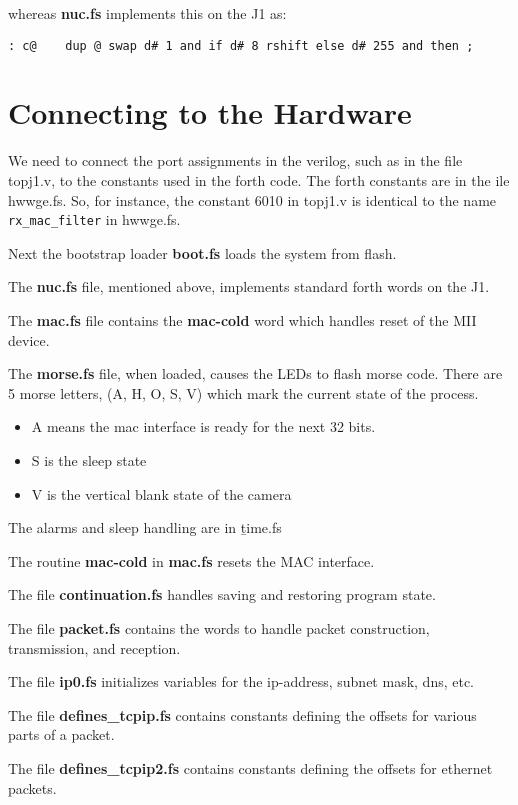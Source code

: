 whereas {\bf nuc.fs} implements this on the J1 as:
\begin{verbatim}
: c@    dup @ swap d# 1 and if d# 8 rshift else d# 255 and then ;
\end{verbatim}

\section{Connecting to the Hardware}

We need to connect the port assignments in the verilog, such as in
the file topj1.v, to the constants used in the forth code. The forth
constants are in the ile hwwge.fs. So, for instance, the constant
6010 in topj1.v is identical to the name \verb|rx_mac_filter| in hwwge.fs.

Next the bootstrap loader {\bf boot.fs} loads the system from flash.

The {\bf nuc.fs} file, mentioned above, implements standard forth words
on the J1.

The {\bf mac.fs} file contains the {\bf mac-cold} word which handles
reset of the MII device.

The {\bf morse.fs} file, when loaded, causes the LEDs to flash morse code.
There are 5 morse letters, (A, H, O, S, V) which mark the current state
of the process.
\begin{itemize}
\item A means the mac interface is ready for the next 32 bits.
\item S is the sleep state
\item V is the vertical blank state of the camera
\end{itemize}
The alarms and sleep handling are in {\b time.fs}

The routine {\bf mac-cold} in {\bf mac.fs} resets the MAC interface.

The file {\bf continuation.fs} handles saving and restoring program state.

The file {\bf packet.fs} contains the words to handle packet construction,
transmission, and reception.

The file {\bf ip0.fs} initializes variables for the ip-address, 
subnet mask, dns, etc.

The file {\bf defines\_tcpip.fs} contains constants defining the
offsets for various parts of a packet.

The file {\bf defines\_tcpip2.fs} contains constants defining the
offsets for ethernet packets.

